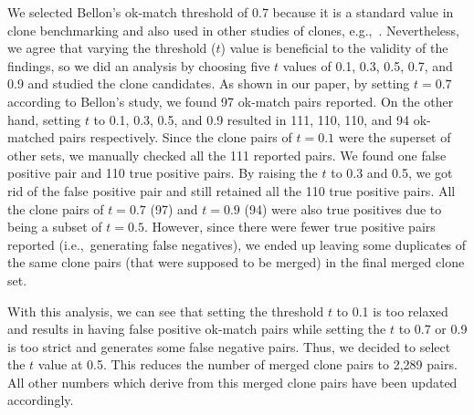 \documentclass[a4paper,twoside,10pt]{reviewresponse}
\begin{document}
We selected Bellon's ok-match threshold of 0.7 because it is a standard value in
clone benchmarking \citep{Bellon2007} and also used in other studies of clones,
e.g.,~\cite{Sajnani2016}. Nevertheless, we agree that varying the threshold ($t$)
value is beneficial to the validity of the findings, so we did an analysis by
choosing five $t$ values of 0.1, 0.3, 0.5, 0.7, and 0.9 and studied the clone
candidates. As shown in our paper, by setting $t=0.7$ according to Bellon's
study, we found 97 ok-match pairs reported. On the other hand, setting $t$ to
0.1, 0.3, 0.5, and 0.9 resulted in 111, 110, 110, and 94 ok-matched pairs
respectively. Since the clone pairs of $t=0.1$ were the superset of other sets, 
we manually checked all the 111 reported pairs. We found one false positive pair
and 110 true positive pairs. By raising the $t$ to 0.3 and 0.5, we got rid of
the false positive pair and still retained all the 110 true positive pairs. All
the clone pairs of $t=0.7$ (97) and $t=0.9$ (94) were also true positives due to
being a subset of $t=0.5$. However, since there were fewer true positive pairs
reported (i.e.,~generating false negatives), we ended up leaving some duplicates
of the same clone pairs (that were supposed to be merged) in the final merged
clone set.

With this analysis, we can see that setting the threshold $t$ to 0.1 is too
relaxed and results in having false positive ok-match pairs while setting the
$t$ to 0.7 or 0.9 is too strict and generates some false negative pairs. Thus,
we decided to select the $t$ value at 0.5. This reduces the number of merged
clone pairs to 2,289 pairs. All other numbers which derive from this merged
clone pairs have been updated accordingly.

\end{document}
